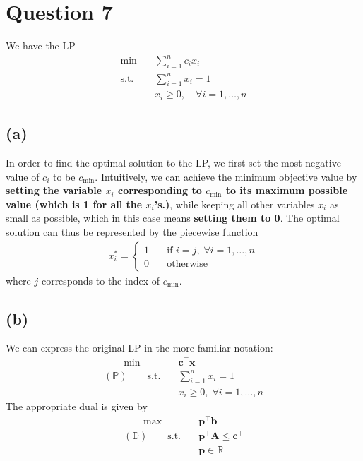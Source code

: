 \documentclass[12pt]{article}
\begin{document}
\newpage

\section*{Question 7}
We have the LP \begin{align*}
    \min \quad & \sum_{i=1}^{n} c_i x_i \\ 
    \text{s.t.} \quad & \sum_{i=1}^{n} x_i = 1 \\ 
    & x_i \geq 0, \quad \forall i = 1, \dots , n
\end{align*}

\subsection*{(a)}

In order to find the optimal solution to the LP, we first set the most negative value of $c_i$ to be $c_{\text{min}}$. Intuitively, we can achieve the minimum objective value by \textbf{setting the variable $x_i$ corresponding to $c_{\text{min}}$ to its maximum possible value (which is 1 for all the $x_i$'s.)}, while keeping all other variables $x_i$ as small as possible, which in this case means \textbf{setting them to 0}. The optimal solution can thus be represented by the piecewise function \begin{align*}
    x_i^{*} = \begin{cases}
        1 & \quad \text{if } i = j, \; \forall i = 1, \dots , n\\ 
        0 & \quad \text{otherwise}
    \end{cases}
\end{align*} where $j$ corresponds to the index of $c_{\text{min}}$. 

\subsection*{(b)}
We can express the original LP in the more familiar notation: \begin{align*}
    \qquad \min \quad & \mathbf{c}^{\top}\mathbf{x} \\ 
    (\mathbb{P}) \qquad \text{s.t.} \quad & \sum_{i=1}^{n} x_i = 1 \\ 
    \qquad & x_i \geq 0, \; \forall i = 1, \dots, n
\end{align*} The appropriate dual is given by \begin{align*}
    \qquad \max \quad & \mathbf{p}^{\top}\mathbf{b} \\ 
    (\mathbb{D}) \qquad \text{s.t.} \quad & \mathbf{p}^{\top}\mathbf{A} \leq \mathbf{c}^{\top} \\ 
    \qquad & \mathbf{p} \in \mathbb{R}
\end{align*} \\
\end{document}
